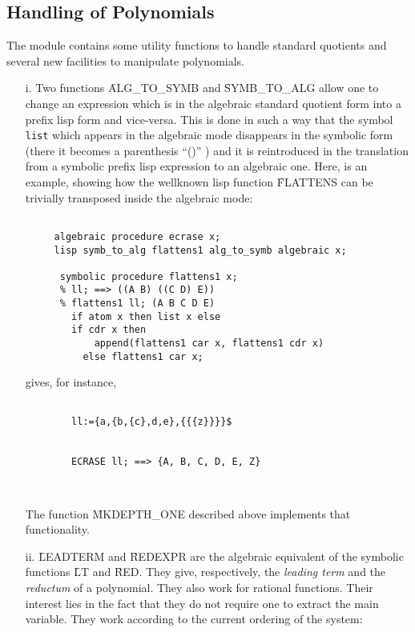 \subsection{Handling of Polynomials}
The module contains some utility functions to handle
standard quotients and several new facilities to manipulate polynomials.
\begin{itemize}
\item[i.] Two functions \f{ALG\_TO\_SYMB} and \f{SYMB\_TO\_ALG}
allow one to change an expression which is in the algebraic standard
quotient form into a prefix lisp form and vice-versa. This is done
in such a way that the symbol \verb+list+ which appears in the
algebraic mode disappears in the symbolic form (there it becomes
a parenthesis ``()'' ) and it is reintroduced in the translation
from a symbolic prefix lisp expression  to an algebraic one.
Here, is an example, showing how the wellknown lisp function
\f{FLATTENS} can be trivially transposed inside the algebraic mode:
\begin{verbatim}

     algebraic procedure ecrase x;
     lisp symb_to_alg flattens1 alg_to_symb algebraic x;

      symbolic procedure flattens1 x;
      % ll; ==> ((A B) ((C D) E))
      % flattens1 ll; (A B C D E)
        if atom x then list x else
        if cdr x then
            append(flattens1 car x, flattens1 cdr x)
          else flattens1 car x;

\end{verbatim}


gives, for instance,
\begin{verbatim}

        ll:={a,{b,{c},d,e},{{{z}}}}$


        ECRASE ll; ==> {A, B, C, D, E, Z}



\end{verbatim}
The function \f{MKDEPTH\_ONE} described above implements that functionality.
\item[ii.]
\f{LEADTERM} and \f{REDEXPR} are the algebraic equivalent of the
symbolic functions \f{LT} and \f{RED}. They give, respectively, the
{\em leading term} and the {\em reductum} of a polynomial. They also work
for rational functions. Their interest lies in the fact that they do not
require one to extract the main variable. They work according to the current
ordering of the system:
\begin{verbatim}


\end{verbatim}
\end{itemize}
